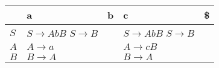 \documentclass{standalone}
\providecommand\lightrule{%
	\arrayrulecolor{black!30}%
	\midrule[\lightrulewidth]%
	\arrayrulecolor{black}}
\begin{document}
\begin{tabularx}{\textwidth}{XXXXX}
     & a & b & c & \$ \\
    \midrule
        \(S\)
        &
        \(S \rightarrow AbB\)
        \newline
        \(S \rightarrow B\)
        &
        
        &
        \(S \rightarrow AbB\)
        \newline
        \(S \rightarrow B\)
        &
        \\ \lightrule
        \(A\)
        &
        \(A \rightarrow a\)
        &
        
        &
        \(A \rightarrow cB\)
        &
        \\ \lightrule
        \(B\)
        &
        \(B \rightarrow A\)
        &
        
        &
        \(B \rightarrow A\)
        &
\end{tabularx}
\end{document}
